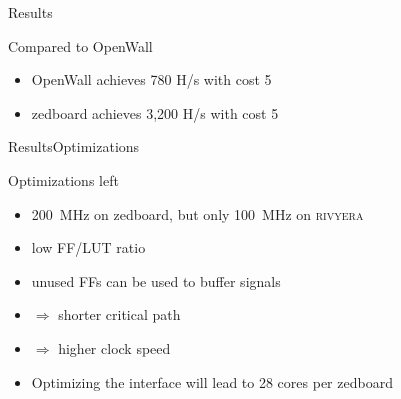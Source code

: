 \begin{frame}{Results}
\begin{block}{Compared to OpenWall}
\begin{itemize}
  \item OpenWall achieves 780 H/s with cost 5
  \item zedboard achieves 3,200 H/s with cost 5
\end{itemize}
\end{block}
\end{frame}
\note{}

\begin{frame}{Results}{Optimizations}
    \begin{block}{Optimizations left}
      \begin{itemize}
          \item \SI{200}{\mega\hertz} on zedboard, but only \SI{100}{\mega\hertz} on \textsc{rivyera}
          \item low FF/LUT ratio
          \item unused FFs can be used to buffer signals
          \item[] $\Rightarrow$ shorter critical path
          \item[] $\Rightarrow$ higher clock speed
          \item Optimizing the interface will lead to 28 cores per zedboard
      \end{itemize}
    \end{block}
\end{frame}
\note{}